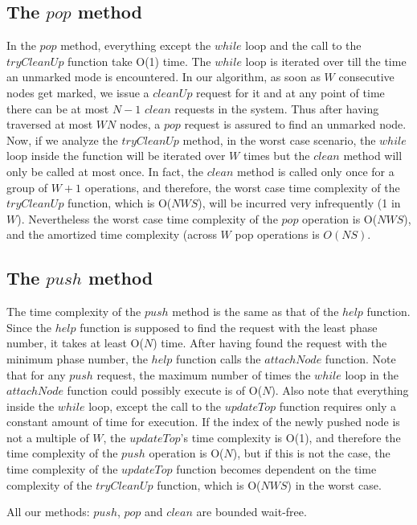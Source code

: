 \documentclass{llncs}
\begin{document}
\begin{appendix}
\subsection{The $pop$ method}
In the $pop$ method, everything except the $while$ loop and the call to the 
$tryCleanUp$ function take O(1) time. The $while$ loop is iterated over till 
the time an unmarked mode is encountered. In our algorithm, as soon as $W$ 
consecutive nodes get marked, we issue a $cleanUp$ request for it and at 
any point of time there can be at most $N-1$ $clean$ requests in the system. 
Thus after having traversed at most $WN$ nodes, a $pop$ request is assured to 
find an unmarked node. Now, if we analyze the $tryCleanUp$ method, 
in the worst case scenario, the $while$ loop inside the function will be iterated over 
$W$ times but the $clean$ method will only be called at most once. In fact, the $clean$ 
method is called only once for a group of $W+1$ operations, and therefore, the worst case 
time complexity of the $tryCleanUp$ function, which is O($NWS$), will be incurred very infrequently
(1 in $W$). 
Nevertheless the worst case time complexity of the $pop$ operation is O($NWS$), and the
amortized time complexity (across $W$ pop operations is $O(NS)$. 

\subsection{The $push$ method \label{push_time_complexity}}
The time complexity of the $push$ method is the same as that of the $help$ function. 
Since the $help$ function is supposed to find the request with the least phase number, 
it takes at least O($N$) time. After having found the request with the minimum 
phase number, the $help$ function calls the $attachNode$ function. Note that for any 
$push$ request, the maximum number of times the $while$ loop in the $attachNode$ 
function could possibly execute is of O($N$). Also note that everything inside the $while$ loop, 
except the call to the $updateTop$ function requires only a constant amount of 
time for execution. If the index of the newly pushed node is not a multiple of 
$W$, the $updateTop$'s time complexity is O(1), and therefore the time complexity
of the $push$ operation is O($N$), but if this is not the case, the time complexity 
of the $updateTop$ function becomes dependent on the time 
complexity of the $tryCleanUp$ function, which is O($NWS$) in the worst case. 

All our methods: $push$, $pop$ and $clean$ are bounded wait-free.


\end{appendix}
\end{document}
